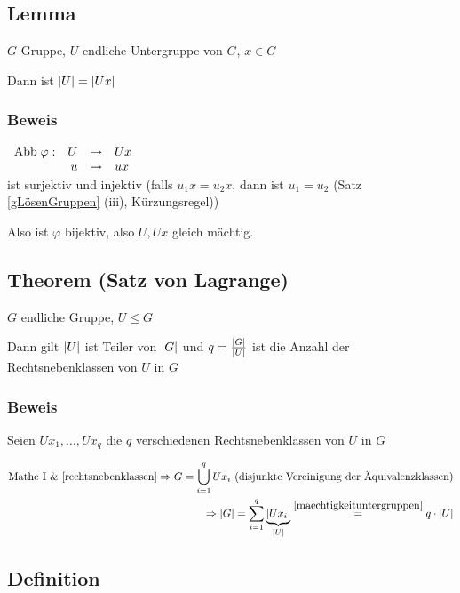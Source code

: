 \subsection[Lemma: Mächtigkeit von Untergruppen]{Lemma}
\label{maechtigkeituntergruppen}
$G$ Gruppe, $U$ endliche Untergruppe von $G$, $x \in G$

Dann ist $\left|U\right| = \left|Ux\right|$

\subsubsection*{Beweis}

$\begin{array}[b]{rrcl}
\mathrm{ Abb } \; \varphi: 	& U &\to& Ux \\
				& u &\mapsto& ux
\end{array}$
\\ist surjektiv
und injektiv 
(falls $u_1x=u_2x$, dann ist $u_1 = u_2$ (Satz \ref{gLösenGruppen} (iii), Kürzungsregel))

Also ist $\varphi$ bijektiv, also $U, Ux$ gleich mächtig.

\subsection[Theorem: Satz von Lagrange]{Theorem (Satz von Lagrange)} \label{lagrange}

$G$ endliche Gruppe, $U \leqslant G$

Dann gilt $\left|U\right|$ ist Teiler von $\left|G\right|$ und $q = \frac{\left|G\right|}{\left|U\right|}$ ist die Anzahl der Rechtsnebenklassen von $U$ in $G$

\subsubsection*{Beweis}

Seien $Ux_1, \dots, Ux_q$ die $q$ verschiedenen Rechtsnebenklassen von $U$ in $G$

\[\begin{split}
\text{Mathe I \& \ref{rechtsnebenklassen}}\Rightarrow G = \bigcup_{i=1}^{q}Ux_i \text{ (disjunkte Vereinigung der Äquivalenzklassen)}
\\\Rightarrow \left|G\right| = \sum_{i=1}^{q}\underbrace{\left|Ux_i\right|}_{\left|U\right|} \stackrel{\ref{maechtigkeituntergruppen}}{=} q \cdot \left|U\right| \end{split}\]


\subsection[Definition: Potenzen]{Definition}

